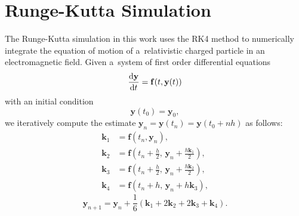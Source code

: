 	\section{Runge-Kutta Simulation}
	\label{sec:rks}
		The Runge-Kutta simulation in this work uses the \ac{RK4} method to numerically integrate the equation of motion of a~relativistic charged particle in an electromagnetic field. Given a~system of first order differential equations
			\begin{equation}
				\derivative{\mathbf{y}}{t}(t) = \mathbf{f}(t,\mathbf{y}(t))
			\end{equation}
		with an initial condition
			\begin{equation}
				\mathbf{y}(t_0) = \mathbf{y}_0,
			\end{equation}
		we iteratively compute the estimate $\mathbf{y}_n = \mathbf{y}(t_n) = \mathbf{y}(t_0+nh)$ as follows:
			\begin{align}
				\mathbf{k}_1 &= \mathbf{f}(t_n,\mathbf{y}_n),\\
				\mathbf{k}_2 &= \mathbf{f}\left(t_n+\frac{h}{2},\, \mathbf{y}_n+\frac{h\mathbf{k}_1}{2}\right),\\
				\mathbf{k}_3 &= \mathbf{f}\left(t_n+\frac{h}{2},\, \mathbf{y}_n+\frac{h\mathbf{k}_2}{2}\right),\\
				\mathbf{k}_4 &= \mathbf{f}(t_n+h,\, \mathbf{y}_n+h\mathbf{k}_3),
			\end{align}
			\begin{equation}
				\mathbf{y}_{n+1} = \mathbf{y}_n + \frac{1}{6}(\mathbf{k}_1+2\mathbf{k}_2+2\mathbf{k}_3+\mathbf{k}_4).
			\end{equation}
		

